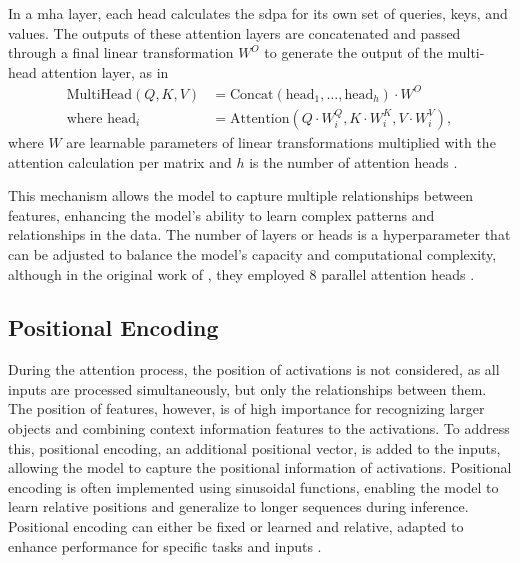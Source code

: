 In a \gls{mha} layer, each head calculates the \gls{sdpa} for its own set of queries, keys, and values. The outputs of these attention layers are concatenated and passed through a final linear transformation \( W^O \) to generate the output of the multi-head attention layer, as in
\begin{equation}
    \begin{aligned}
        \text{MultiHead}(Q, K, V) &= \text{Concat}(\text{head}_1, \ldots, \text{head}_h) \cdot W^O \\
        \text{where head}_i &= \text{Attention}(Q \cdot W_i^Q, K \cdot W_i^K, V \cdot W_i^V),
    \end{aligned}
\end{equation}
where \( W \) are learnable parameters of linear transformations multiplied with the attention calculation per matrix and \( h \) is the number of attention heads \autocite{Vaswani.Shazeer.ea2017}. 

This mechanism allows the model to capture multiple relationships between features, enhancing the model's ability to learn complex patterns and relationships in the data. The number of layers or heads is a hyperparameter that can be adjusted to balance the model's capacity and computational complexity, although in the original work of \textcite{Vaswani.Shazeer.ea2017}, they employed 8 parallel attention heads \autocite{Han.Wang.ea2023,Khan.Naseer.ea2021,Liu.Zhang.ea2024,Vaswani.Shazeer.ea2017,Zhang.Lipton.ea2023}.

\subsection{Positional Encoding}

During the attention process, the position of activations is not considered, as all inputs are processed simultaneously, but only the relationships between them. The position of features, however, is of high importance for recognizing larger objects and combining context information features to the activations. To address this, positional encoding, an additional positional vector, is added to the inputs, allowing the model to capture the positional information of activations. Positional encoding is often implemented using sinusoidal functions, enabling the model to learn relative positions and generalize to longer sequences during inference. Positional encoding can either be fixed or learned and relative, adapted to enhance performance for specific tasks and inputs \autocite{Cordonnier.Loukas.ea2020,Han.Wang.ea2023,He.Zhang.ea2016,Khan.Naseer.ea2021,Liu.Zhang.ea2024,Vaswani.Shazeer.ea2017,Zhang.Lipton.ea2023}.

